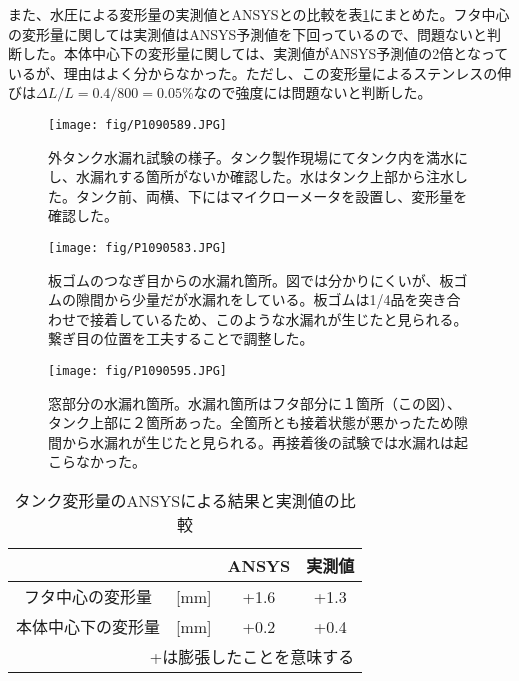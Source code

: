 \documentclass[11pt]{ltjsreport}
\newcommand{\tabref}[1]{表\ref{#1}}
\begin{document}
また、水圧による変形量の実測値とANSYSとの比較を\tabref{CompDeform}にまとめた。フタ中心の変形量に関しては実測値はANSYS予測値を下回っているので、問題ないと判断した。本体中心下の変形量に関しては、実測値がANSYS予測値の2倍となっているが、理由はよく分からなかった。ただし、この変形量によるステンレスの伸びは$\Delta L/L=0.4/800=0.05$\%なので強度には問題ないと判断した。


\begin{figure}[htbp]
\centering
\texttt{[image: fig/P1090589.JPG]}
\caption[外タンク水漏れ試験の様子]{外タンク水漏れ試験の様子。タンク製作現場にてタンク内を満水にし、水漏れする箇所がないか確認した。水はタンク上部から注水した。タンク前、両横、下にはマイクローメータを設置し、変形量を確認した。}
\label{WaterTest}
\end{figure}


\begin{figure}[htbp]
\begin{minipage}{0.47\textwidth}
\centering
\texttt{[image: fig/P1090583.JPG]}
\caption[板ゴムのつなぎ目からの水漏れ箇所]{板ゴムのつなぎ目からの水漏れ箇所。図では分かりにくいが、板ゴムの隙間から少量だが水漏れをしている。板ゴムは1/4品を突き合わせで接着しているため、このような水漏れが生じたと見られる。繋ぎ目の位置を工夫することで調整した。}
\label{WaterTestItagomu}
\end{minipage}
\hfil
\begin{minipage}{0.47\textwidth}
\centering
\texttt{[image: fig/P1090595.JPG]}
\caption[窓部分からの水漏れ箇所]{窓部分の水漏れ箇所。水漏れ箇所はフタ部分に１箇所（この図）、タンク上部に２箇所あった。全箇所とも接着状態が悪かったため隙間から水漏れが生じたと見られる。再接着後の試験では水漏れは起こらなかった。}
\label{WaterTestMado}
\end{minipage}
\end{figure}

\begin{table}[htbp]
\caption[ANSYSの結果と、実際のタンク変形量]{タンク変形量のANSYSによる結果と実測値の比較}
\centering
\begin{tabular}{clcc}
\hline \hline
& & ANSYS & 実測値 \\
 \hline
フタ中心の変形量 & [mm] & +1.6 & +1.3\\
本体中心下の変形量 & [mm] & +0.2 & +0.4 \\
\hline \hline
\multicolumn{4}{r}{+は膨張したことを意味する}
\end{tabular}
\label{CompDeform}
\end{table}
\end{document}

